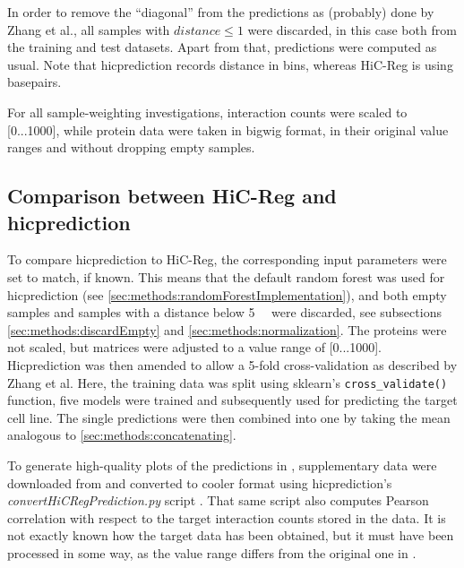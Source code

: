 In order to remove the ``diagonal'' from the predictions as (probably) done by Zhang et al.,
all samples with $distance \leq 1$ were discarded, in this case both from the training and test datasets.
Apart from that, predictions were computed as usual.
Note that hicprediction records distance in bins, whereas HiC-Reg is using basepairs.

For all sample-weighting investigations, interaction counts were scaled to [0...1000], 
while protein data were taken in bigwig format, in their original value ranges and without dropping empty samples.

\subsection{Comparison between HiC-Reg and hicprediction}
To compare hicprediction to HiC-Reg, the corresponding input parameters were set to match, if known.
This means that the default random forest was used for hicprediction (see \ref{sec:methods:randomForestImplementation}),
and both empty samples and samples with a distance
below \SI{5}{\kilo\bp} were discarded, see subsections \ref{sec:methods:discardEmpty}
and \autoref{sec:methods:normalization}.
The proteins were not scaled, but matrices were adjusted to a value range of [0...1000].
Hicprediction was then amended to allow a 5-fold cross-validation as described by Zhang et al. 
Here, the training data was split using sklearn's \texttt{cross\_validate()} function,
five models were trained and subsequently used for predicting the target cell line. 
The single predictions were then combined into one by taking the mean analogous to \autoref{sec:methods:concatenating}.

To generate high-quality plots of the predictions in \cite{Zhang2019}, supplementary data
were downloaded from \cite{zhangMaterial01,zhangMaterial02,zhangMaterial03} and converted to cooler format using hicprediction's 
\emph{convertHiCRegPrediction.py} script \cite{Krauth2020}. 
That same script also computes Pearson correlation with respect to the target interaction counts
stored in the data.
It is not exactly known how the target data has been obtained, 
but it must have been processed in some way, 
as the value range differs from the original one in \cite{Rao2014}.

